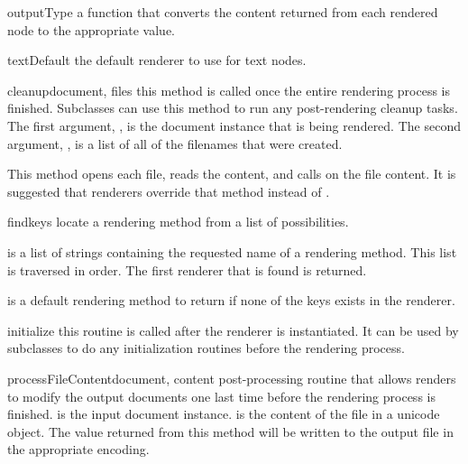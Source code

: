 \begin{memberdesc}[Renderer]{outputType}
a function that converts the content returned from each rendered
node to the appropriate value.
\end{memberdesc}

\begin{memberdesc}[Renderer]{textDefault}
the default renderer to use for text nodes.
\end{memberdesc}


\begin{methoddesc}[Renderer]{cleanup}{document, files}
this method is called once the entire rendering process is finished.  
Subclasses can use this method to run any post-rendering cleanup tasks.
The first argument, , is the document instance that is
being rendered.  The second argument, , is a list of all of the
filenames that were created.

This method opens each file, reads the content, and 
calls  on the file content.  It is suggested
that renderers override that method instead of .
\end{methoddesc}

\begin{methoddesc}[Renderer]{find}{keys}
locate a rendering method from a list of possibilities.  

 is a list of strings containing the requested name of a
rendering method.  This list is traversed in order.  The first renderer
that is found is returned.

 is a default rendering method to return if none of the keys
exists in the renderer.
\end{methoddesc}

\begin{methoddesc}[Renderer]{initialize}{}
this routine is called after the renderer is instantiated.  It can be used
by subclasses to do any initialization routines before the rendering process.
\end{methoddesc}

\begin{methoddesc}[Renderer]{processFileContent}{document, content}
post-processing routine that allows renders to modify the output documents
one last time before the rendering process is finished.  
is the input document instance.   is the content of the 
file in a unicode object.  The value returned from this method will be
written to the output file in the appropriate encoding.
\end{methoddesc}

